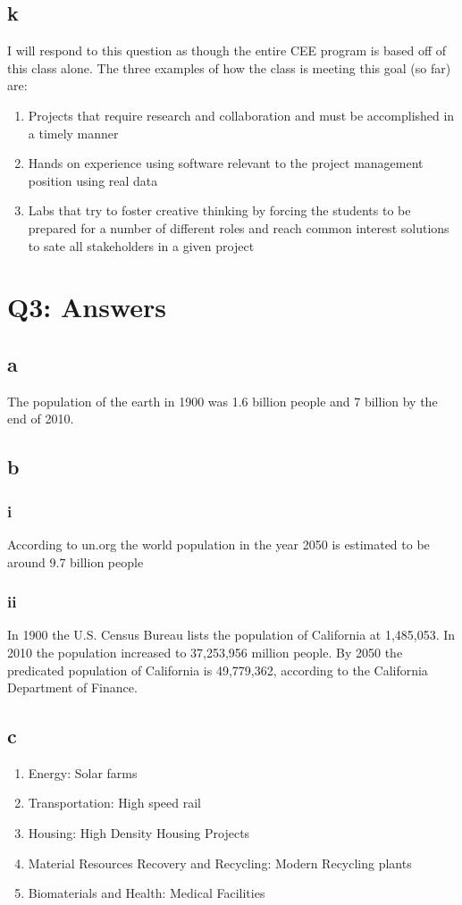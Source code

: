 \documentclass[12pt]{article} %
\begin{document}
	\subsection{k}
		I will respond to this question as though the entire CEE program is based off of this class alone. The three examples of how the class is meeting this goal (so far) are:
		\begin{enumerate}
			\item Projects that require research and collaboration and must be accomplished in a timely manner
			\item Hands on experience using software relevant to the project management position using real data
			\item Labs that try to foster creative thinking by forcing the students to be prepared for a number of different roles and reach common interest solutions to sate all stakeholders in a given project
		\end{enumerate}


\section{Q3: Answers}

	\subsection{a}
		The population of the earth in 1900 was 1.6 billion people and 7 billion by the end of 2010.

	\subsection{b}
		\subsubsection{i}
			According to un.org the world population in the year 2050 is estimated to be around 9.7 billion people
		\subsubsection{ii}
			In 1900 the U.S. Census Bureau lists the population of California at 1,485,053. In 2010 the population increased to 37,253,956 million people. By 2050 the predicated population of California is 49,779,362, according to the California Department of Finance.

	\subsection{c}
		\begin{enumerate}
			\item Energy: Solar farms
			\item Transportation: High speed rail
			\item Housing: High Density Housing Projects
			\item Material Resources Recovery and Recycling: Modern Recycling plants
			\item Biomaterials and Health: Medical Facilities
		\end{enumerate}
\end{document}
